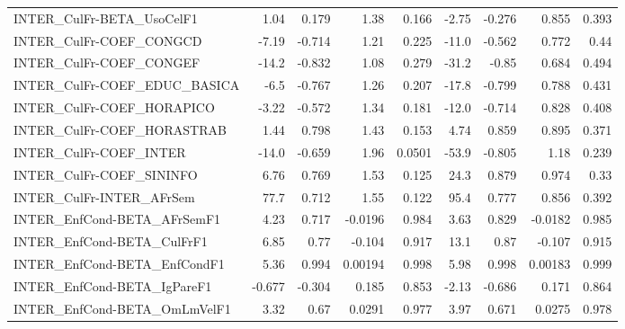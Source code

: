 \begin{tabular}{lrrrrrrrr}
INTER\_CulFr-BETA\_UsoCelF1             &        1.04 &        0.179 &    1.38 &    0.166 &      -2.75 &      -0.276 &        0.855 &         0.393 \\
INTER\_CulFr-COEF\_CONGCD               &       -7.19 &       -0.714 &    1.21 &    0.225 &      -11.0 &      -0.562 &        0.772 &          0.44 \\
INTER\_CulFr-COEF\_CONGEF               &       -14.2 &       -0.832 &    1.08 &    0.279 &      -31.2 &       -0.85 &        0.684 &         0.494 \\
INTER\_CulFr-COEF\_EDUC\_BASICA          &        -6.5 &       -0.767 &    1.26 &    0.207 &      -17.8 &      -0.799 &        0.788 &         0.431 \\
INTER\_CulFr-COEF\_HORAPICO             &       -3.22 &       -0.572 &    1.34 &    0.181 &      -12.0 &      -0.714 &        0.828 &         0.408 \\
INTER\_CulFr-COEF\_HORASTRAB            &        1.44 &        0.798 &    1.43 &    0.153 &       4.74 &       0.859 &        0.895 &         0.371 \\
INTER\_CulFr-COEF\_INTER                &       -14.0 &       -0.659 &    1.96 &   0.0501 &      -53.9 &      -0.805 &         1.18 &         0.239 \\
INTER\_CulFr-COEF\_SININFO              &        6.76 &        0.769 &    1.53 &    0.125 &       24.3 &       0.879 &        0.974 &          0.33 \\
INTER\_CulFr-INTER\_AFrSem              &        77.7 &        0.712 &    1.55 &    0.122 &       95.4 &       0.777 &        0.856 &         0.392 \\
INTER\_EnfCond-BETA\_AFrSemF1           &        4.23 &        0.717 & -0.0196 &    0.984 &       3.63 &       0.829 &      -0.0182 &         0.985 \\
INTER\_EnfCond-BETA\_CulFrF1            &        6.85 &         0.77 &  -0.104 &    0.917 &       13.1 &        0.87 &       -0.107 &         0.915 \\
INTER\_EnfCond-BETA\_EnfCondF1          &        5.36 &        0.994 & 0.00194 &    0.998 &       5.98 &       0.998 &      0.00183 &         0.999 \\
INTER\_EnfCond-BETA\_IgPareF1           &      -0.677 &       -0.304 &   0.185 &    0.853 &      -2.13 &      -0.686 &        0.171 &         0.864 \\
INTER\_EnfCond-BETA\_OmLmVelF1          &        3.32 &         0.67 &  0.0291 &    0.977 &       3.97 &       0.671 &       0.0275 &         0.978 \\

\end{tabular}
